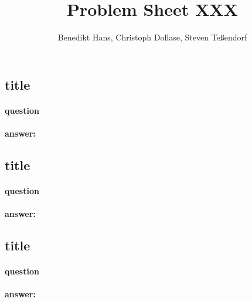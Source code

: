 \documentclass[a4paper,12pt]{article}
\author{Benedikt Hans, Christoph Dollase, Steven Teßendorf}
\title{ \textbf{Problem Sheet XXX}}
\begin{document}
	 
 \maketitle	 
 
 \subsection{title}
 \paragraph{question}
 \paragraph{answer:}
 
 
 \subsection{title}
 \paragraph{question}
 \paragraph{answer:}
 
 
 \subsection{title}
 \paragraph{question}
 \paragraph{answer:}
 
\end{document}
